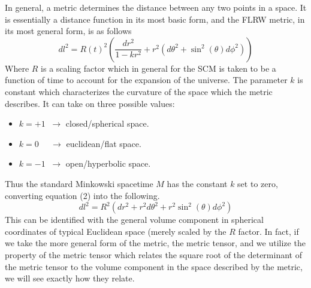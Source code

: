 \documentclass[a4paper]{article}
\begin{document}
    In general, a metric determines the distance between any two points in a
    space. It is essentially a distance function in its most basic form, and
    the FLRW metric, in its most general form, is as follows
    \begin{equation}
        dl^2 = R(t)^2\left(\frac{dr^2}{1-kr^2} + r^2 (d\theta^2 +
            \sin^2(\theta)d\phi^2)\right)    
    \end{equation}
    Where $R$ is a scaling factor which in general for the SCM is taken to be
    a function of time to account for the expansion of the universe. The
    parameter $k$ is constant which characterizes the curvature of the space
    which the metric describes. It can take on three possible values:
    \begin{itemize}
        \item $k=+1 \;\;\rightarrow$ closed/spherical space.
        \item $k=0 \;\;\;\;\;\rightarrow$ euclidean/flat space.
        \item $k=-1 \;\;\rightarrow$ open/hyperbolic space.
    \end{itemize}
    Thus the standard Minkowski spacetime $M$ has the constant $k$ set to zero,
    converting equation (2) into the following.
    \begin{equation}
        dl^2 = R^2\left(dr^2 + r^2d\theta^2 + r^2 \sin^2(\theta) d\phi^2\right)    
    \end{equation}
    This can be identified with the general volume component in spherical
    coordinates of typical Euclidean space (merely scaled by the $R$ factor. In
    fact, if we take the more general form of the metric, the metric tensor,
    and we utilize the property of the metric tensor which relates the square
    root of the determinant of the metric tensor to the volume component in the
    space described by the metric, we will see exactly how they relate.
\end{document}
